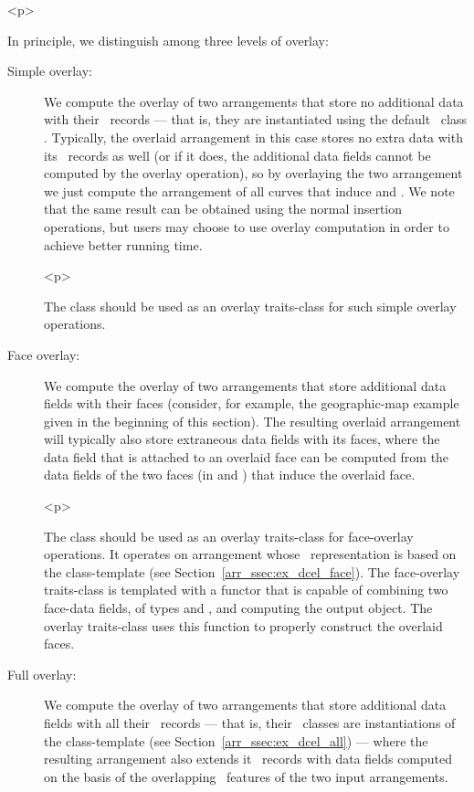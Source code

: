 \begin{ccHtmlOnly}<p>\end{ccHtmlOnly}
In principle, we distinguish among three levels of overlay:
\begin{description}
\item[Simple overlay:]
We compute the overlay of two arrangements that store no additional data
with their \dcel\ records --- that is, they are instantiated using the
default \dcel\ class . Typically, the overlaid
arrangement in this case stores no extra data with its \dcel\ records as
well (or if it does, the additional data fields cannot be computed by
the overlay operation), so by overlaying the two arrangement we just
compute the arrangement of all curves that induce  and .
We note that the same result can be obtained using the normal insertion
operations, but users may choose to use overlay computation in order to
achieve better running time.

\begin{ccHtmlOnly}<p>\end{ccHtmlOnly}
The  class should be used as an overlay
traits-class for such simple overlay operations.
%
\item[Face overlay:]
We compute the overlay of two arrangements that store additional data
fields with their faces (consider, for example, the geographic-map example
given in the beginning of this section). The resulting overlaid arrangement
will typically also store extraneous data fields with its faces, where the
data field that is attached to an overlaid face can be computed from the
data fields of the two faces (in  and ) that induce
the overlaid face.

\begin{ccHtmlOnly}<p>\end{ccHtmlOnly}
The  class should be used as an overlay
traits-class for face-overlay operations. It operates on arrangement whose
\dcel\ representation is based on the 
class-template (see Section~\ref{arr_ssec:ex_dcel_face}). The face-overlay
traits-class is templated with a functor that is capable of combining two
face-data fields, of types  and
, and computing the output 
object. The overlay traits-class uses this function to properly construct
the overlaid faces.
%
\item[Full overlay:]
We compute the overlay of two arrangements that store additional data
fields with all their \dcel\ records --- that is, their \dcel\ classes
are instantiations of the  class-template (see
Section~\ref{arr_ssec:ex_dcel_all}) --- where the resulting arrangement
also extends it \dcel\ records with data fields computed on the basis
of the overlapping \dcel\ features of the two input arrangements.
\end{description}

